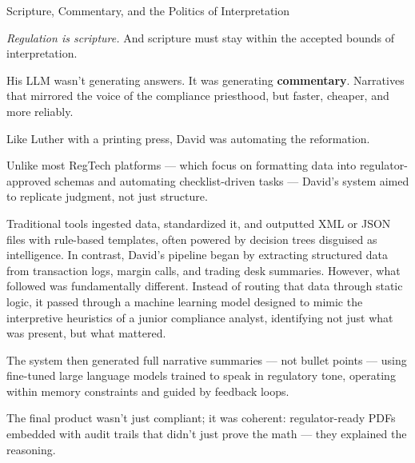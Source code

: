 \begin{HistoricalSidebar}{Scripture, Commentary, and the Politics of Interpretation}
    \medskip
    
    \textit{Regulation is scripture.} And scripture must stay within the accepted bounds of interpretation.
    
    \medskip
    
    His LLM wasn’t generating answers. It was generating \textbf{commentary}.
    Narratives that mirrored the voice of the compliance priesthood, but faster, cheaper, and more reliably.

    \medskip
    
    Like Luther with a printing press, David was automating the reformation.
    
\end{HistoricalSidebar}

\medskip

Unlike most RegTech platforms --- which focus on formatting data into regulator-approved schemas and automating 
checklist-driven tasks --- David’s system aimed to replicate judgment, not just structure. 

Traditional tools ingested 
data, standardized it, and outputted XML or JSON files with rule-based templates, often powered by decision trees 
disguised as intelligence. In contrast, David’s pipeline began by extracting structured data from transaction logs, 
margin calls, and trading desk summaries. However, what followed was fundamentally different. Instead of routing that 
data through static logic, it passed through a machine learning model designed to mimic the interpretive heuristics 
of a junior compliance analyst, identifying not just what was present, but what mattered. 

The system then generated full narrative summaries --- not bullet points --- using fine-tuned large language models 
trained to speak in regulatory 
tone, operating within memory constraints and guided by feedback loops. 

The final product wasn’t just compliant; it 
was coherent: regulator-ready PDFs embedded with audit trails that didn’t just prove the math ---  they explained 
the reasoning.

\medskip

